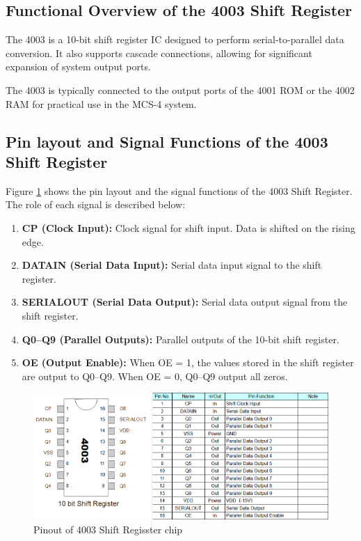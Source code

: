 \subsection{Functional Overview of the 4003 Shift Register}
The 4003 is a 10-bit shift register IC designed to perform serial-to-parallel data conversion. It also supports cascade connections, allowing for significant expansion of system output ports.

The 4003 is typically connected to the output ports of the 4001 ROM or the 4002 RAM for practical use in the MCS-4 system.

\subsection{Pin layout and Signal Functions of the 4003 Shift Register}
Figure \ref{fig:PINOUT4003} shows the pin layout and the signal functions of the 4003 Shift Register. The role of each signal is described below:

\begin{enumerate}[\textbf{(\arabic*)}]
  \item \textbf{CP (Clock Input):}  
    Clock signal for shift input. Data is shifted on the rising edge.

  \item \textbf{DATAIN (Serial Data Input):}  
    Serial data input signal to the shift register.

  \item \textbf{SERIALOUT (Serial Data Output):}  
    Serial data output signal from the shift register.

  \item \textbf{Q0--Q9 (Parallel Outputs):}  
    Parallel outputs of the 10-bit shift register.

  \item \textbf{OE (Output Enable):}  
    When OE = 1, the values stored in the shift register are output to Q0--Q9.  
    When OE = 0, Q0--Q9 output all zeros.
\end{enumerate}

\begin{figure}
    \includegraphics[width=1.0\columnwidth]{./Figure/Pinout4003.png}
    \caption{Pinout of 4003 Shift Regisster chip}
    \label{fig:PINOUT4003}
\end{figure}

